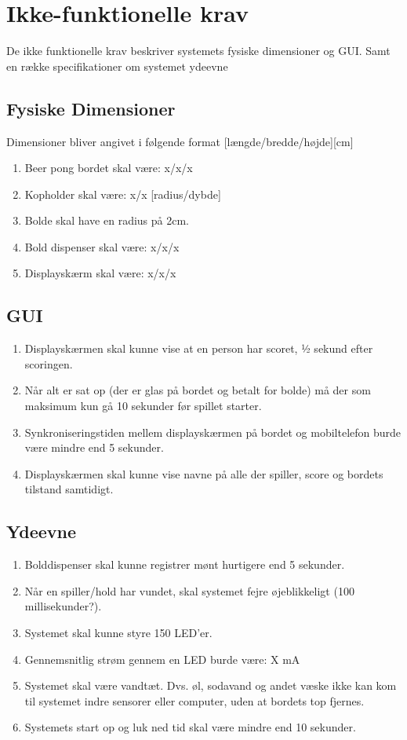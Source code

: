 \documentclass[12pt]{article}
\begin{document}
\section{Ikke-funktionelle krav}
De ikke funktionelle krav beskriver systemets fysiske dimensioner og GUI. Samt en række specifikationer om systemet ydeevne 

\subsection{Fysiske Dimensioner}
Dimensioner bliver angivet i følgende format [længde/bredde/højde][cm]
\begin{enumerate}
\item Beer pong bordet skal være: x/x/x
\item Kopholder skal være: x/x [radius/dybde]
\item Bolde skal have en radius på 2cm.
\item Bold dispenser skal være: x/x/x
\item Displayskærm skal være: x/x/x
\end{enumerate}

\subsection{GUI}
\begin{enumerate}
\item Displayskærmen skal kunne vise at en person har scoret, ½ sekund efter scoringen.
\item Når alt er sat op (der er glas på bordet og betalt for bolde) må der som maksimum kun gå 10 sekunder før spillet starter.
\item Synkroniseringstiden mellem displayskærmen på bordet og mobiltelefon burde være mindre end 5 sekunder.
\item Displayskærmen skal kunne vise navne på alle der spiller, score og bordets tilstand samtidigt.
\end{enumerate}

\subsection{Ydeevne}
\begin{enumerate}
\item Bolddispenser skal kunne registrer mønt hurtigere end 5 sekunder.
\item Når en spiller/hold har vundet, skal systemet fejre øjeblikkeligt (100 millisekunder?).
\item Systemet skal kunne styre 150 LED'er.
\item Gennemsnitlig strøm gennem en LED burde være: X mA
\item Systemet skal være vandtæt. Dvs. øl, sodavand og andet væske ikke kan kom til systemet indre sensorer eller computer, uden at bordets top fjernes.
\item Systemets start op og luk ned tid skal være mindre end 10 sekunder.
\end{enumerate}
\end{document}
